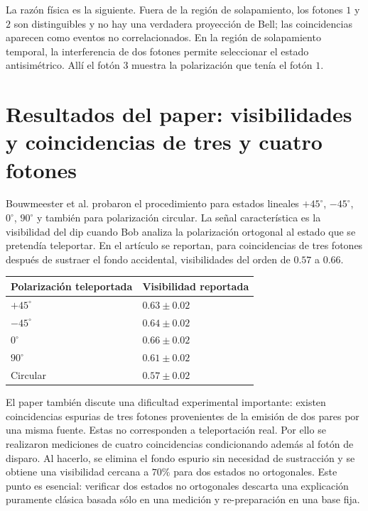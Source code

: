 \documentclass[../main.tex]{subfiles}
\begin{document}
La razón física es la siguiente. Fuera de la región de solapamiento, los fotones $1$ y $2$ son distinguibles y no hay una verdadera proyección de Bell; las coincidencias aparecen como eventos no correlacionados. En la región de solapamiento temporal, la interferencia de dos fotones permite seleccionar el estado antisimétrico. Allí el fotón $3$ muestra la polarización que tenía el fotón $1$.

\section{Resultados del paper: visibilidades y coincidencias de tres y cuatro fotones}

Bouwmeester et al. probaron el procedimiento para estados lineales $+45^\circ$, $-45^\circ$, $0^\circ$, $90^\circ$ y también para polarización circular. La señal característica es la visibilidad del dip cuando Bob analiza la polarización ortogonal al estado que se pretendía teleportar. En el artículo se reportan, para coincidencias de tres fotones después de sustraer el fondo accidental, visibilidades del orden de $0.57$ a $0.66$.

\begin{center}
\renewcommand{\arraystretch}{1.25}
\begin{tabular}{>{\centering\arraybackslash}p{} >{\centering\arraybackslash}p{}}
\toprule
\textbf{Polarización teleportada} & \textbf{Visibilidad reportada} \\
\midrule
$+45^\circ$ & $0.63\pm0.02$ \\
$-45^\circ$ & $0.64\pm0.02$ \\
$0^\circ$ & $0.66\pm0.02$ \\
$90^\circ$ & $0.61\pm0.02$ \\
Circular & $0.57\pm0.02$ \\
\bottomrule
\end{tabular}
\end{center}

El paper también discute una dificultad experimental importante: existen coincidencias espurias de tres fotones provenientes de la emisión de dos pares por una misma fuente. Estas no corresponden a teleportación real. Por ello se realizaron mediciones de cuatro coincidencias condicionando además al fotón de disparo. Al hacerlo, se elimina el fondo espurio sin necesidad de sustracción y se obtiene una visibilidad cercana a $70\%$ para dos estados no ortogonales. Este punto es esencial: verificar dos estados no ortogonales descarta una explicación puramente clásica basada sólo en una medición y re-preparación en una base fija.
\end{document}
